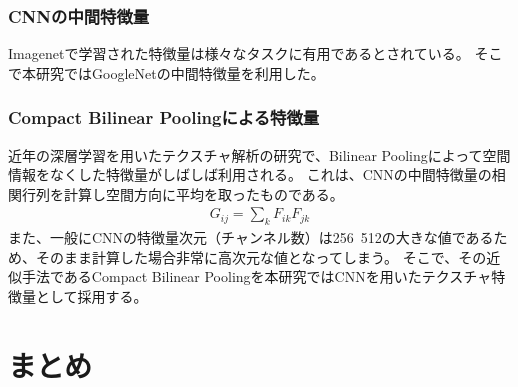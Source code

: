 \subsubsection{CNNの中間特徴量}
Imagenetで学習された特徴量は様々なタスクに有用であるとされている。
そこで本研究ではGoogleNetの中間特徴量を利用した。

\subsubsection{Compact Bilinear Poolingによる特徴量}
近年の深層学習を用いたテクスチャ解析の研究で、Bilinear Poolingによって空間情報をなくした特徴量がしばしば利用される。
これは、CNNの中間特徴量の相関行列を計算し空間方向に平均を取ったものである。
\begin{eqnarray}
G_{ij} = \sum_k{F_{ik} F_{jk}}
\end{eqnarray}
また、一般にCNNの特徴量次元（チャンネル数）は256~512の大きな値であるため、そのまま計算した場合非常に高次元な値となってしまう。
そこで、その近似手法であるCompact Bilinear Pooling\cite{gao2016compact}を本研究ではCNNを用いたテクスチャ特徴量として採用する。

\section{まとめ}
